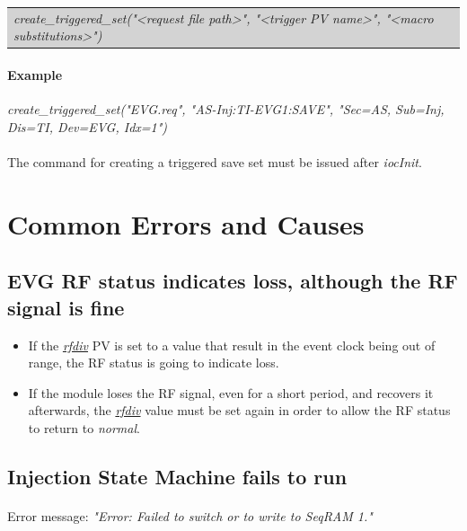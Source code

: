 \documentclass[openany]{article}
\begin{document}
			\bigskip
			\colorbox{lightgray}{
				\begin{tabularx}{0.9\textwidth}{X}
				\emph{create\_triggered\_set("\textless request file path\textgreater", "\textless trigger PV name\textgreater", "\textless macro substitutions\textgreater")}
				\end{tabularx}
			}

			\paragraph{Example} \emph{create\_triggered\_set("EVG.req", "AS-Inj:TI-EVG1:SAVE", "Sec=AS, Sub=Inj, Dis=TI, Dev=EVG, Idx=1")}

			\paragraph{} {\color{red}The command for creating a triggered save set must be issued after \emph{iocInit}.}

\section{Common Errors and Causes}\label{sec:common-error-causes}

	\subsection{EVG RF status indicates loss, although the RF signal is fine}

		\begin{itemize}
		\item If the \hyperref[pvgroup:evg-configuration]{\emph{rfdiv}} PV is set to a value that result in the event clock being out of range, the RF status is going to indicate loss.
		\item If the module loses the RF signal, even for a short period, and recovers it afterwards, the \hyperref[pvgroup:evg-configuration]{\emph{rfdiv}} value must be set again in order to allow the RF status to return to \emph{normal}.
		\end{itemize}

	\subsection{Injection State Machine fails to run}

		\paragraph{} Error message: \emph{"Error: Failed to switch or to write to SeqRAM 1."}
\end{document}
